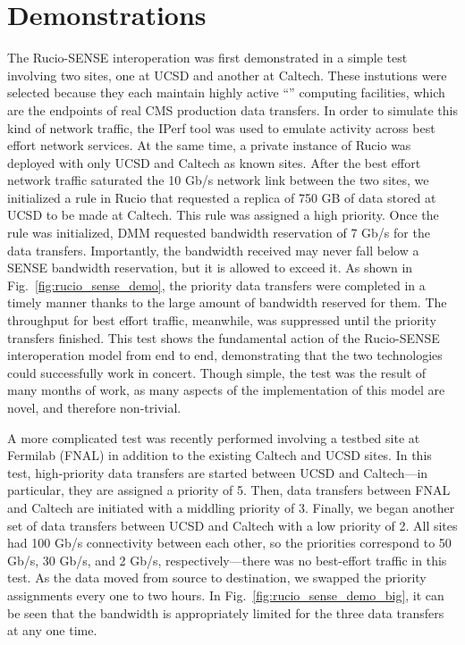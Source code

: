 \section{Demonstrations}
The Rucio-SENSE interoperation was first demonstrated in a simple test involving two sites, one at UCSD and another at Caltech. 
These instutions were selected because they each maintain highly active ``'' computing facilities, which are the endpoints of real CMS production data transfers. 
In order to simulate this kind of network traffic, the IPerf tool was used to emulate activity across best effort network services. 
At the same time, a private instance of Rucio was deployed with only UCSD and Caltech as known sites. 
After the best effort network traffic saturated the 10 Gb/s network link between the two sites, we initialized a rule in Rucio that requested a replica of 750 GB of data stored at UCSD to be made at Caltech. 
This rule was assigned a high priority. 
Once the rule was initialized, DMM requested bandwidth reservation of 7 Gb/s for the data transfers. 
Importantly, the bandwidth received may never fall below a SENSE bandwidth reservation, but it is allowed to exceed it. 
As shown in Fig.~\ref{fig:rucio_sense_demo}, the priority data transfers were completed in a timely manner thanks to the large amount of bandwidth reserved for them. 
The throughput for best effort traffic, meanwhile, was suppressed until the priority transfers finished. 
This test shows the fundamental action of the Rucio-SENSE interoperation model from end to end, demonstrating that the two technologies could successfully work in concert. 
Though simple, the test was the result of many months of work, as many aspects of the implementation of this model are novel, and therefore non-trivial. 

A more complicated test was recently performed involving a testbed site at Fermilab (FNAL) in addition to the existing Caltech and UCSD sites. 
In this test, high-priority data transfers are started between UCSD and Caltech---in particular, they are assigned a priority of 5. 
Then, data transfers between FNAL and Caltech are initiated with a middling priority of 3. 
Finally, we began another set of data transfers between UCSD and Caltech with a low priority of 2. 
All sites had 100 Gb/s connectivity between each other, so the priorities correspond to 50 Gb/s, 30 Gb/s, and 2 Gb/s, respectively---there was no best-effort traffic in this test. 
As the data moved from source to destination, we swapped the priority assignments every one to two hours. 
In Fig.~\ref{fig:rucio_sense_demo_big}, it can be seen that the bandwidth is appropriately limited for the three data transfers at any one time. 

